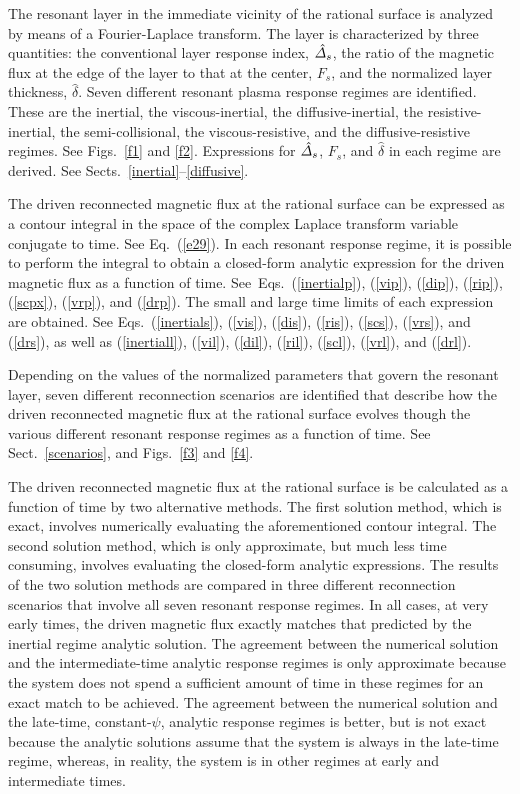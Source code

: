 \documentclass[12pt,prb,aps]{revtex4-1}
\begin{document}
The resonant layer in the immediate vicinity of the rational surface is analyzed by means of a Fourier-Laplace transform. The layer is characterized by three quantities:
the conventional layer response index, $\hat{\mit\Delta}_s$, the ratio of the magnetic flux at the edge of the layer to that at the center, $F_s$, and the normalized layer thickness, $\hat{\delta}$. 
Seven different resonant plasma response regimes are identified. 
These are the inertial, the viscous-inertial, the diffusive-inertial, the resistive-inertial, the semi-collisional, the
viscous-resistive, and the diffusive-resistive regimes. See Figs.~\ref{f1} and \ref{f2}. Expressions for $\hat{\mit\Delta}_s$, $F_s$, and $\hat{\delta}$ in each regime are derived. See Sects.~\ref{inertial}--\ref{diffusive}. 

The driven reconnected magnetic
flux at the rational surface can be expressed as a contour integral in the space of the complex Laplace transform variable conjugate to time. See Eq.~(\ref{e29}). 
In each resonant response regime, it is possible to perform the integral to obtain a closed-form analytic expression for the driven magnetic flux as a function of time. See~Eqs.~(\ref{inertialp}),
(\ref{vip}), (\ref{dip}), (\ref{rip}), (\ref{scpx}), (\ref{vrp}), and (\ref{drp}). The small and large time limits of each expression are obtained. See Eqs.~(\ref{inertials}), (\ref{vis}), (\ref{dis}), (\ref{ris}), (\ref{scs}), 
(\ref{vrs}), and (\ref{drs}), 
as well as (\ref{inertiall}), (\ref{vil}), (\ref{dil}), (\ref{ril}), (\ref{scl}), (\ref{vrl}), and (\ref{drl}). 

Depending on the values of the normalized parameters that govern the resonant layer, seven different reconnection scenarios are identified that describe how the
driven reconnected magnetic flux at the rational surface evolves though the various different resonant response regimes as a function of time. See Sect.~\ref{scenarios}, and Figs.~\ref{f3} and \ref{f4}. 

The driven reconnected magnetic flux at the rational surface is be calculated as a function of time  by two alternative  methods.  The first solution  method, which is exact,  involves numerically 
evaluating the aforementioned contour integral. The second solution method, which is only approximate,  but much less time consuming,  involves evaluating the closed-form analytic expressions. The results of the two
solution methods are compared in three different reconnection scenarios that involve all seven resonant response regimes. In all cases, at very early times, the driven magnetic flux exactly matches that
predicted by the inertial regime analytic solution. The agreement between the numerical solution and the intermediate-time analytic response regimes  is only approximate because the
system does not spend a sufficient amount of time in these regimes for an exact match to be achieved. The agreement between the numerical solution and the late-time, constant-$\psi$,
analytic response regimes is better, but is not exact because the analytic solutions assume that the system is always in the late-time regime, whereas, in reality, the
system is in other regimes at early and intermediate times. 
\end{document}
